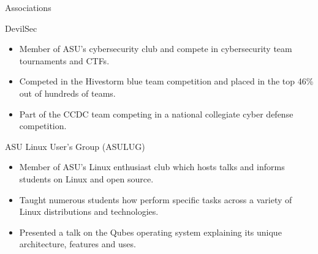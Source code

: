 \documentclass{article}
\newlength{\tabin}
\newlength{\secsep}
\newcommand{\lineunder}{\vspace*{-8pt} \\ \hspace*{-6pt} \hrulefill \\ \vspace*{-15pt}}
\newenvironment{tabbedsection}[1]{
  \begin{list}{}{
      \setlength{\itemsep}{0pt}
      \setlength{\labelsep}{0pt}
      \setlength{\labelwidth}{0pt}
      \setlength{\leftmargin}{\tabin}
      \setlength{\rightmargin}{\tabin}
      \setlength{\listparindent}{0pt}
      \setlength{\parsep}{0pt}
      \setlength{\parskip}{0pt}
      \setlength{\partopsep}{0pt}
      \setlength{\topsep}{#1}
    }
  \item[]
}{\end{list}}
\newenvironment{resume_section}[1]{
  \filbreak
  \vspace{2\secsep}
  \textsc{\color{blue}\large#1}
  \lineunder
  \begin{tabbedsection}{\secsep}
}{\end{tabbedsection}}
\newenvironment{resume_subsection}[2][]{
  \textbf{\color{BlueViolet}#2} \hfill {\normalsize #1} \hspace{-5em} 
  \begin{tabbedsection}{0.5\secsep}
}{\end{tabbedsection}}
\newenvironment{subitems}{
  \renewcommand{\labelitemi}{-}
  \begin{itemize}
      \setlength{\labelsep}{1em}
}{\end{itemize}}
\begin{document}
\begin{resume_section}{Associations}
  	\begin{resume_subsection}{DevilSec}
        \begin{subitems}
		    \item Member of ASU's cybersecurity club and compete in cybersecurity team tournaments and CTFs.
            \item Competed in the Hivestorm blue team competition and placed in the top 46\% out of hundreds of teams.
            \item Part of the CCDC team competing in a national collegiate cyber defense competition.
        \end{subitems}
  	\end{resume_subsection}
  	\vspace{2\secsep}
  	\begin{resume_subsection}{ASU Linux User's Group (ASULUG)}
        \begin{subitems}
            \item Member of ASU's Linux enthusiast club which hosts talks and informs students on Linux and open source. 
            \item Taught numerous students how perform specific tasks across a variety of Linux distributions and technologies.
            \item Presented a talk on the Qubes operating system explaining its unique architecture, features and uses.
        \end{subitems}
  	\end{resume_subsection}
\end{resume_section}
\end{document}
